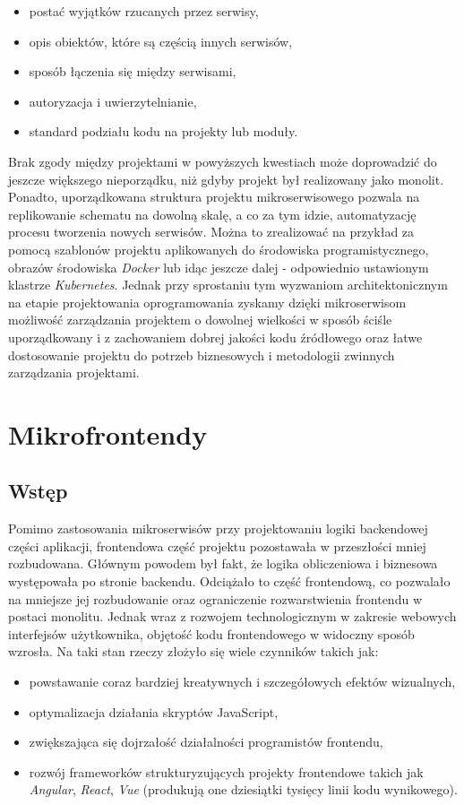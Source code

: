 \documentclass{SGGW-thesis}
\begin{document}
\begin{itemize}
	\item postać wyjątków rzucanych przez serwisy,
	\item opis obiektów, które są częścią innych serwisów,
	\item sposób łączenia się między serwisami,
	\item autoryzacja i uwierzytelnianie,
	\item standard podziału kodu na projekty lub moduły.
\end{itemize}
Brak zgody między projektami w powyższych kwestiach może doprowadzić do jeszcze większego nieporządku, niż gdyby projekt był realizowany jako monolit. Ponadto, uporządkowana struktura projektu mikroserwisowego pozwala na replikowanie schematu na dowolną skalę, a co za tym idzie, automatyzację procesu tworzenia nowych serwisów. Można to zrealizować na przykład za pomocą szablonów projektu aplikowanych do środowiska programistycznego, obrazów środowiska \textit{Docker} lub idąc jeszcze dalej - odpowiednio ustawionym klastrze \textit{Kubernetes}. Jednak przy sprostaniu tym wyzwaniom architektonicznym na etapie projektowania oprogramowania zyskamy dzięki mikroserwisom możliwość zarządzania projektem o dowolnej wielkości w sposób ściśle uporządkowany i z zachowaniem dobrej jakości kodu źródłowego oraz łatwe dostosowanie projektu do potrzeb biznesowych i metodologii zwinnych zarządzania projektami.

\chapter{Mikrofrontendy}
\section{Wstęp}
Pomimo zastosowania mikroserwisów przy projektowaniu logiki backendowej części aplikacji, frontendowa część projektu pozostawała w przeszłości mniej rozbudowana. Głównym powodem był fakt, że logika obliczeniowa i biznesowa występowała po stronie backendu. Odciążało to część frontendową, co pozwalało na mniejsze jej rozbudowanie oraz ograniczenie rozwarstwienia frontendu w postaci monolitu. Jednak wraz z rozwojem technologicznym w zakresie webowych interfejsów użytkownika, objętość kodu frontendowego w widoczny sposób wzrosła. Na taki stan rzeczy złożyło się wiele czynników takich jak:

\begin{itemize}
	\item powstawanie coraz bardziej kreatywnych i szczegółowych efektów wizualnych,
	\item optymalizacja działania skryptów JavaScript,
	\item zwiększająca się dojrzałość działalności programistów frontendu,
	\item rozwój frameworków strukturyzujących projekty frontendowe takich jak \textit{Angular}, \textit{React}, \textit{Vue} (produkują one dziesiątki tysięcy linii kodu wynikowego).
\end{itemize}
\end{document}
